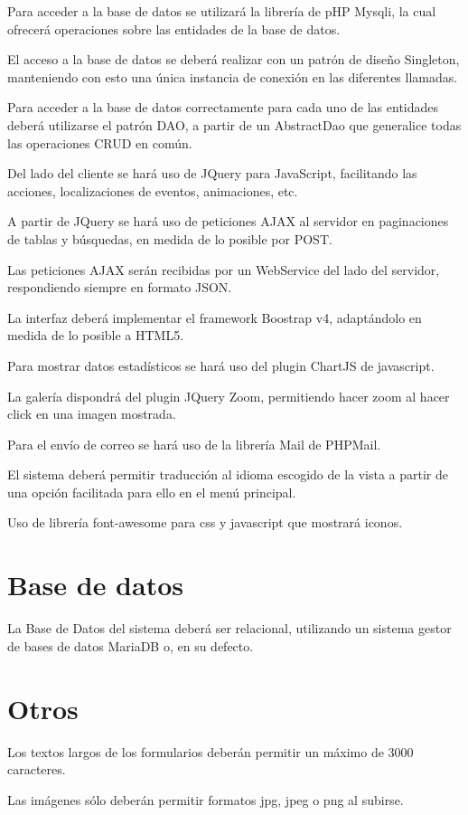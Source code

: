 Para acceder a la base de datos se utilizar\'{a} la librer\'{i}a de pHP Mysqli, la cual ofrecer\'{a} operaciones sobre las entidades de la base de datos.

El acceso a la base de datos se deber\'{a} realizar con un patr\'{o}n de dise\~{n}o Singleton, manteniendo con esto una \'{u}nica instancia de conexi\'{o}n en las diferentes llamadas.

Para acceder a la base de datos correctamente para cada uno de las entidades deber\'{a} utilizarse el patr\'{o}n DAO, a partir de un AbstractDao que generalice todas las operaciones CRUD en com\'{u}n.

Del lado del cliente se har\'{a} uso de JQuery para JavaScript, facilitando las acciones, localizaciones de eventos, animaciones, etc.

A partir de JQuery se har\'{a} uso de peticiones AJAX al servidor en paginaciones de tablas y b\'{u}squedas, en medida de lo posible por POST.

Las peticiones AJAX ser\'{a}n recibidas por un WebService del lado del servidor, respondiendo siempre en formato JSON.

La interfaz deber\'{a} implementar el framework Boostrap v4, adapt\'{a}ndolo en medida de lo posible a HTML5.

Para mostrar datos estad\'{i}sticos se har\'{a} uso del plugin ChartJS de javascript.

La galer\'{i}a dispondr\'{a} del plugin JQuery Zoom, permitiendo hacer zoom al hacer click en una imagen mostrada.

Para el env\'{i}o de correo se har\'{a} uso de la librer\'{i}a Mail de PHPMail.

El sistema deber\'{a} permitir traducci\'{o}n al idioma escogido de la vista a partir de una opci\'{o}n facilitada para ello en el men\'{u} principal.

Uso de librer\'{i}a font-awesome para css y javascript que mostrar\'{a} iconos.


\section{Base de datos}

La Base de Datos del sistema deber\'{a} ser relacional, utilizando un sistema gestor de bases de datos MariaDB o, en su defecto.


\section{Otros}

Los textos largos de los formularios deber\'{a}n permitir un m\'{a}ximo de 3000 caracteres.

Las im\'{a}genes s\'{o}lo deber\'{a}n permitir formatos jpg, jpeg o png al subirse.

